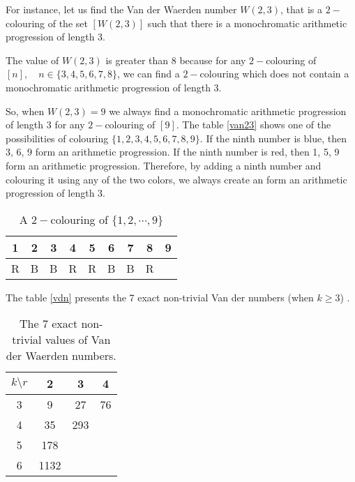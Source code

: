 For instance, let us find the Van der Waerden number $W(2,3)$, that is a $2-$colouring  of the set $[W(2,3)]$ such that there is a monochromatic arithmetic progression of length $3.$

The value of $W(2,3)$ is greater than $8$ because for any $2-$colouring of $[n],\quad n\in \{3,4,5,6,7,8\}$, we can find a $2-$colouring which does not contain a monochromatic arithmetic progression of length 3. 

So, when $W(2,3)=9$ we always find a monochromatic arithmetic progression of length 3 for any $2-$colouring of $[9].$ The table \eqref{van23} shows one of the possibilities of colouring $\{1,2,3,4,5,6,7,8,9\}.$  If the ninth number is {\color{blue} blue}, then{ \color{blue}3, 6, 9}  form an arithmetic progression. If the ninth number is {\color{red} red}, then {\color{red}1, 5, 9} form an arithmetic progression. Therefore, by adding a ninth number and colouring it using any of the two colors, we always create an form an arithmetic progression of length 3.

\begin{table}[h]
\begin{center}
\begin{tabular}{ccccccccc}
\hline
1 & 2 & 3 & 4  & 5 & 6 & 7 & 8 & 9 \\ \hline
\color{red}R & \color{blue}B & \color{blue}B & \color{red}R & \color{red}R & \color{blue}B & \color{blue}B & \color{red}R  & \\
\hline 
\end{tabular} 
\end{center}
\caption{A $2-$colouring of $\{1,2,\cdots, 9\}$} \label{van23}
\end{table}

The table \eqref{vdn} presents the 7 exact non-trivial Van der numbers  (when $k\geq 3$) \citep{dransfield2004}.

\begin{table}[h]

\begin{center}
\begin{tabular}{|c|c|c|c|}
\hline 
$k \setminus r$ & 2 & 3 & 4  \\ 
\hline 
3 & 9 & 27 & 76  \\ 
\hline 
4 & 35 & 293 &   \\ 
\hline 
5 & 178 &  &   \\ 
\hline 
6 & 1132 &  &   \\ 
\hline 

\end{tabular}
\end{center}
\caption{The 7 exact non-trivial values of Van der Waerden numbers.} \label{vdn}
\end{table} 

